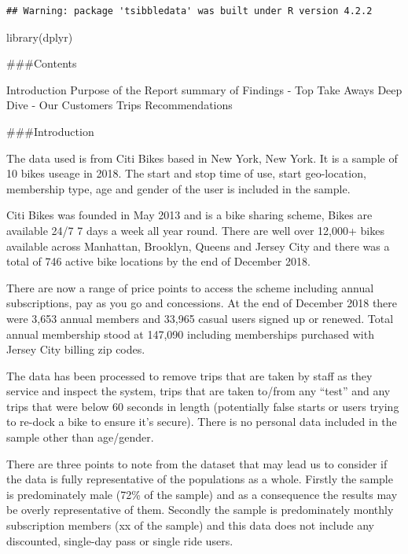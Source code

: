 \documentclass[
]{article}
\newenvironment{Shaded}{\begin{snugshade}}{\end{snugshade}}
\newcommand{\FunctionTok}[1]{\textcolor[rgb]{0.00,0.00,0.00}{#1}}
\newcommand{\NormalTok}[1]{#1}
\begin{document}
\begin{verbatim}
## Warning: package 'tsibbledata' was built under R version 4.2.2
\end{verbatim}

\begin{Shaded}
\begin{Highlighting}[]
\FunctionTok{library}\NormalTok{(dplyr)}
\end{Highlighting}
\end{Shaded}

\#\#\#Contents

Introduction Purpose of the Report summary of Findings - Top Take Aways
Deep Dive - Our Customers Trips Recommendations

\#\#\#Introduction

The data used is from Citi Bikes based in New York, New York. It is a
sample of 10 bikes useage in 2018. The start and stop time of use, start
geo-location, membership type, age and gender of the user is included in
the sample.

Citi Bikes was founded in May 2013 and is a bike sharing scheme, Bikes
are available 24/7 7 days a week all year round. There are well over
12,000+ bikes available across Manhattan, Brooklyn, Queens and Jersey
City and there was a total of 746 active bike locations by the end of
December 2018.

There are now a range of price points to access the scheme including
annual subscriptions, pay as you go and concessions. At the end of
December 2018 there were 3,653 annual members and 33,965 casual users
signed up or renewed. Total annual membership stood at 147,090 including
memberships purchased with Jersey City billing zip codes.

The data has been processed to remove trips that are taken by staff as
they service and inspect the system, trips that are taken to/from any
``test'' and any trips that were below 60 seconds in length (potentially
false starts or users trying to re-dock a bike to ensure it's secure).
There is no personal data included in the sample other than age/gender.

There are three points to note from the dataset that may lead us to
consider if the data is fully representative of the populations as a
whole. Firstly the sample is predominately male (72\% of the sample) and
as a consequence the results may be overly representative of them.
Secondly the sample is predominately monthly subscription members (xx of
the sample) and this data does not include any discounted, single-day
pass or single ride users.
\end{document}
